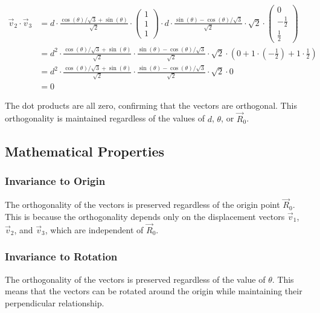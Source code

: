 \begin{align}
\vec{v}_2 \cdot \vec{v}_3 &= d \cdot \frac{\cos(\theta)/\sqrt{3} + \sin(\theta)}{\sqrt{2}} \cdot \begin{pmatrix} 1 \\ 1 \\ 1 \end{pmatrix} \cdot d \cdot \frac{\sin(\theta) - \cos(\theta)/\sqrt{3}}{\sqrt{2}} \cdot \sqrt{2} \cdot \begin{pmatrix} 0 \\ -\frac{1}{2} \\ \frac{1}{2} \end{pmatrix} \\
&= d^2 \cdot \frac{\cos(\theta)/\sqrt{3} + \sin(\theta)}{\sqrt{2}} \cdot \frac{\sin(\theta) - \cos(\theta)/\sqrt{3}}{\sqrt{2}} \cdot \sqrt{2} \cdot \left(0 + 1 \cdot \left(-\frac{1}{2}\right) + 1 \cdot \frac{1}{2}\right) \\
&= d^2 \cdot \frac{\cos(\theta)/\sqrt{3} + \sin(\theta)}{\sqrt{2}} \cdot \frac{\sin(\theta) - \cos(\theta)/\sqrt{3}}{\sqrt{2}} \cdot \sqrt{2} \cdot 0 \\
&= 0
\end{align}

The dot products are all zero, confirming that the vectors are orthogonal. This orthogonality is maintained regardless of the values of $d$, $\theta$, or $\vec{R}_0$.

\subsection{Mathematical Properties}

\subsubsection{Invariance to Origin}

The orthogonality of the vectors is preserved regardless of the origin point $\vec{R}_0$. This is because the orthogonality depends only on the displacement vectors $\vec{v}_1$, $\vec{v}_2$, and $\vec{v}_3$, which are independent of $\vec{R}_0$.

\subsubsection{Invariance to Rotation}

The orthogonality of the vectors is preserved regardless of the value of $\theta$. This means that the vectors can be rotated around the origin while maintaining their perpendicular relationship.

